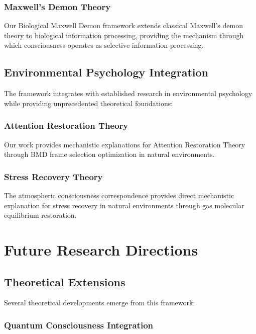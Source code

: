 \documentclass[12pt,a4paper]{article}
\begin{document}
\subsubsection{Maxwell's Demon Theory}

Our Biological Maxwell Demon framework extends classical Maxwell's demon theory \citep{maxwell1867theory, szilard1929decrease} to biological information processing, providing the mechanism through which consciousness operates as selective information processing.

\subsection{Environmental Psychology Integration}

The framework integrates with established research in environmental psychology while providing unprecedented theoretical foundations:

\subsubsection{Attention Restoration Theory}

Our work provides mechanistic explanations for Attention Restoration Theory \citep{kaplan1995restorative} through BMD frame selection optimization in natural environments.

\subsubsection{Stress Recovery Theory}

The atmospheric consciousness correspondence provides direct mechanistic explanation for stress recovery in natural environments \citep{ulrich1991stress} through gas molecular equilibrium restoration.

\section{Future Research Directions}

\subsection{Theoretical Extensions}

Several theoretical developments emerge from this framework:

\subsubsection{Quantum Consciousness Integration}
\end{document}
